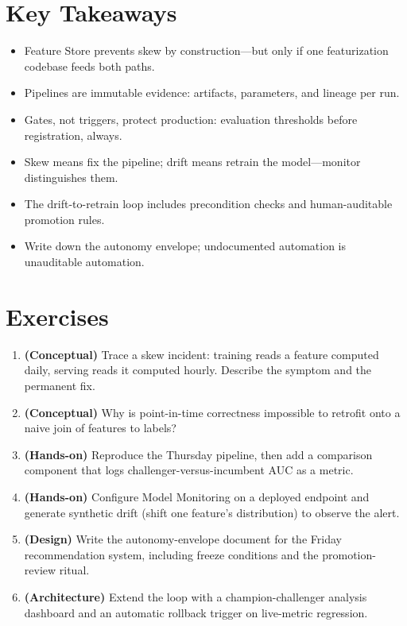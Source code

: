 \section*{Key Takeaways}
\begin{itemize}
    \item Feature Store prevents skew by construction---but only if one featurization codebase feeds both paths.
    \item Pipelines are immutable evidence: artifacts, parameters, and lineage per run.
    \item Gates, not triggers, protect production: evaluation thresholds before registration, always.
    \item Skew means fix the pipeline; drift means retrain the model---monitor distinguishes them.
    \item The drift-to-retrain loop includes precondition checks and human-auditable promotion rules.
    \item Write down the autonomy envelope; undocumented automation is unauditable automation.
\end{itemize}

\section{Exercises}
\begin{enumerate}
    \item \textbf{(Conceptual)} Trace a skew incident: training reads a feature computed daily, serving reads it computed hourly. Describe the symptom and the permanent fix.
    \item \textbf{(Conceptual)} Why is point-in-time correctness impossible to retrofit onto a naive join of features to labels?
    \item \textbf{(Hands-on)} Reproduce the Thursday pipeline, then add a comparison component that logs challenger-versus-incumbent AUC as a metric.
    \item \textbf{(Hands-on)} Configure Model Monitoring on a deployed endpoint and generate synthetic drift (shift one feature's distribution) to observe the alert.
    \item \textbf{(Design)} Write the autonomy-envelope document for the Friday recommendation system, including freeze conditions and the promotion-review ritual.
    \item \textbf{(Architecture)} Extend the loop with a champion-challenger analysis dashboard and an automatic rollback trigger on live-metric regression.
\end{enumerate}
